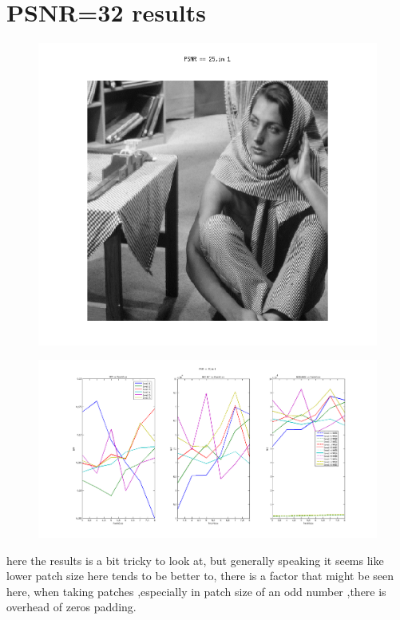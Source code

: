 \documentclass{article}
\begin{document}
\newpage 
\section{PSNR=32 results}
\begin{figure}[h]
\centering
    \begin{center}
       \includegraphics[scale=0.3]{1.png}
    \end{center}
    \noindent
\end{figure}
\begin{figure}[h]
\centering
  
    \begin{center}
       \includegraphics[width=180mm]{fig1H.png}
     
    \end{center}
\end{figure}
here the results is a bit tricky to look at, but generally speaking it seems like lower patch size here tends to be better to, there is a factor that might be seen here, when taking patches ,especially in patch size of an odd number ,there is overhead of zeros padding.
\end{document}
